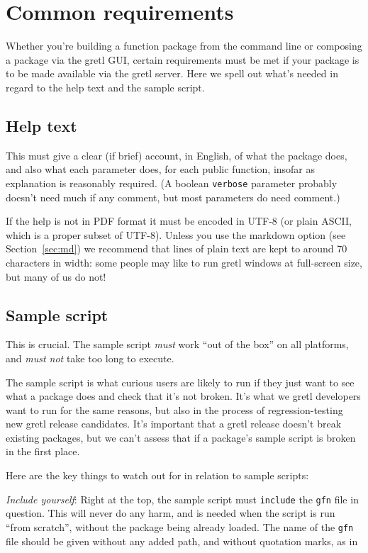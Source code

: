 \documentclass[oneside]{book}
\begin{document}
\section{Common requirements}
\label{sec:common-req}

Whether you're building a function package from the command line or
composing a package via the gretl GUI, certain requirements must be
met if your package is to be made available via the gretl server. Here
we spell out what's needed in regard to the help text and the sample
script.

\subsection{Help text}

This must give a clear (if brief) account, in English, of what the
package does, and also what each parameter does, for each public
function, insofar as explanation is reasonably required. (A boolean
\texttt{verbose} parameter probably doesn't need much if any comment,
but most parameters do need comment.)

If the help is not in PDF format it must be encoded in UTF-8 (or plain
ASCII, which is a proper subset of UTF-8). Unless you use the markdown
option (see Section~\ref{sec:md}) we recommend that lines of plain
text are kept to around 70 characters in width: some people may like
to run gretl windows at full-screen size, but many of us do not!

\subsection{Sample script}
\label{sec:common-sample}

This is crucial. The sample script \textit{must} work ``out of the
box'' on all platforms, and \textit{must not} take too long to
execute.

The sample script is what curious users are likely to run if they just
want to see what a package does and check that it's not broken. It's
what we gretl developers want to run for the same reasons, but also in
the process of regression-testing new gretl release candidates. It's
important that a gretl release doesn't break existing packages,
but we can't assess that if a package's sample script is broken in the
first place.

Here are the key things to watch out for in relation to sample
scripts:

\vspace{1ex}
\textit{Include yourself}: Right at the top, the sample script
  must \texttt{include} the \texttt{gfn} file in question. This will
  never do any harm, and is needed when the script is run ``from
  scratch'', without the package being already loaded.  The name of
  the \texttt{gfn} file should be given without any added path, and
  without quotation marks, as in
\end{document}
